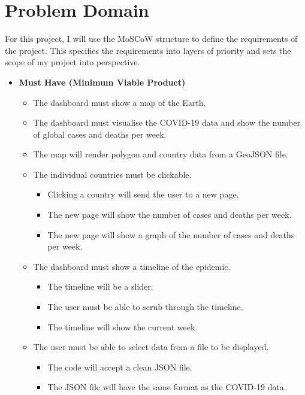 \documentclass{report}
\begin{document}
\chapter{Problem Domain}
For this project, I will use the MoSCoW structure to define the requirements of the project. This specifies the requirements into layers of priority and sets the scope of my project into perspective.\\
\begin{itemize}
    \item \textbf{\Large{Must Have (Minimum Viable Product)}}
    \begin{itemize}
        \item The dashboard must show a map of the Earth.
        \item The dashboard must visualise the COVID-19 data and show the number of global cases and deaths per week.
        \item The map will render polygon and country data from a GeoJSON file.
        \item The individual countries must be clickable.
        \begin{itemize}
            \item Clicking a country will send the user to a new page.
            \item The new page will show the number of cases and deaths per week.
            \item The new page will show a graph of the number of cases and deaths per week. 
        \end{itemize}
        \item The dashboard must show a timeline of the epidemic.
        \begin{itemize}
            \item The timeline will be a slider.
            \item The user must be able to scrub through the timeline.
            \item The timeline will show the current week.
        \end{itemize}
        \item The user must be able to select data from a file to be displayed.
        \begin{itemize}
            \item The code will accept a clean JSON file.
            \item The JSON file will have the same format as the COVID-19 data.
        \end{itemize}

\end{itemize}
\end{itemize}
\end{document}
